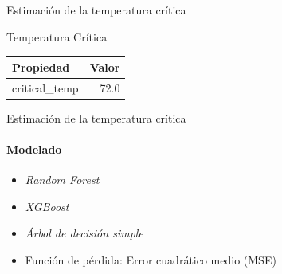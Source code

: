 \documentclass{beamer}
\begin{document}
\begin{frame}{\LARGE Estimación de la temperatura crítica}
\centering
\begin{block}{Temperatura Crítica}
\begin{footnotesize}
\begin{tabular}{lr}
\hline
\textbf{Propiedad} & \textbf{Valor} \\
\hline
critical\_temp & 72.0 \\
\hline
\end{tabular}
\end{footnotesize}
\end{block}





\end{frame}


\begin{frame}{\LARGE Estimación de la temperatura crítica}
    \framesubtitle{Modelado}
    \begin{itemize}
        \item \textit{Random Forest}
        \item \textit{XGBoost}
        \item \textit{Árbol de decisión simple}
    \end{itemize}
    \vspace{1cm}
    \begin{itemize}
        \item Función de pérdida: Error cuadrático medio (MSE)
    \end{itemize}
\end{frame}
\end{document}
